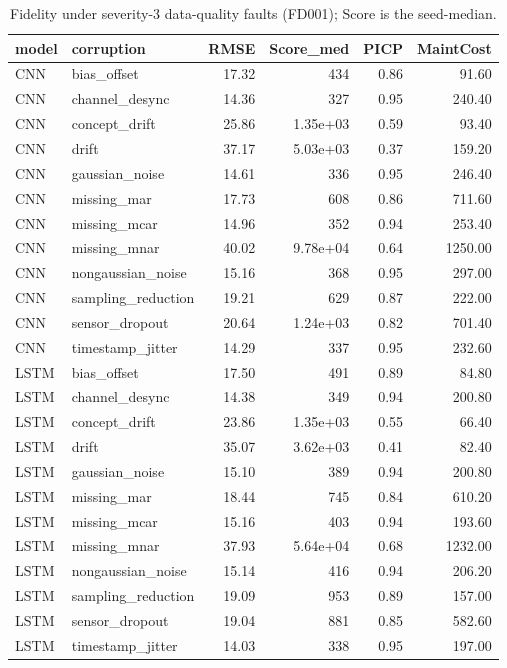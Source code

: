 \begin{table}
\caption{Fidelity under severity-3 data-quality faults (FD001); Score is the seed-median.}
\label{tab:sev3_FD001}
\begin{tabular}{llrrrr}
\toprule  %
model & corruption & RMSE & Score\_med & PICP & MaintCost \\
\midrule
CNN & bias\_offset & 17.32 & 434 & 0.86 & 91.60 \\
CNN & channel\_desync & 14.36 & 327 & 0.95 & 240.40 \\
CNN & concept\_drift & 25.86 & 1.35e+03 & 0.59 & 93.40 \\
CNN & drift & 37.17 & 5.03e+03 & 0.37 & 159.20 \\
CNN & gaussian\_noise & 14.61 & 336 & 0.95 & 246.40 \\
CNN & missing\_mar & 17.73 & 608 & 0.86 & 711.60 \\
CNN & missing\_mcar & 14.96 & 352 & 0.94 & 253.40 \\
CNN & missing\_mnar & 40.02 & 9.78e+04 & 0.64 & 1250.00 \\
CNN & nongaussian\_noise & 15.16 & 368 & 0.95 & 297.00 \\
CNN & sampling\_reduction & 19.21 & 629 & 0.87 & 222.00 \\
CNN & sensor\_dropout & 20.64 & 1.24e+03 & 0.82 & 701.40 \\
CNN & timestamp\_jitter & 14.29 & 337 & 0.95 & 232.60 \\
LSTM & bias\_offset & 17.50 & 491 & 0.89 & 84.80 \\
LSTM & channel\_desync & 14.38 & 349 & 0.94 & 200.80 \\
LSTM & concept\_drift & 23.86 & 1.35e+03 & 0.55 & 66.40 \\
LSTM & drift & 35.07 & 3.62e+03 & 0.41 & 82.40 \\
LSTM & gaussian\_noise & 15.10 & 389 & 0.94 & 200.80 \\
LSTM & missing\_mar & 18.44 & 745 & 0.84 & 610.20 \\
LSTM & missing\_mcar & 15.16 & 403 & 0.94 & 193.60 \\
LSTM & missing\_mnar & 37.93 & 5.64e+04 & 0.68 & 1232.00 \\
LSTM & nongaussian\_noise & 15.14 & 416 & 0.94 & 206.20 \\
LSTM & sampling\_reduction & 19.09 & 953 & 0.89 & 157.00 \\
LSTM & sensor\_dropout & 19.04 & 881 & 0.85 & 582.60 \\
LSTM & timestamp\_jitter & 14.03 & 338 & 0.95 & 197.00 \\

\end{tabular}
\end{table}
